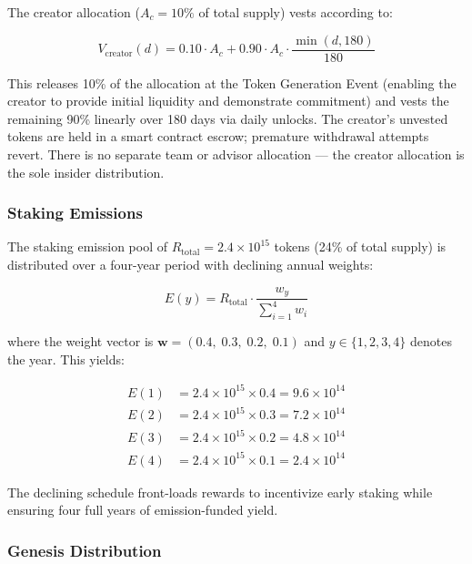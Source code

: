 The creator allocation ($A_c = 10\%$ of total supply) vests according to:

\begin{equation}
  V_{\text{creator}}(d) = 0.10 \cdot A_c + 0.90 \cdot A_c \cdot \frac{\min(d, 180)}{180}
  \label{eq:creator-vesting}
\end{equation}

This releases 10\% of the allocation at the Token Generation Event (enabling
the creator to provide initial liquidity and demonstrate commitment) and vests
the remaining 90\% linearly over 180 days via daily unlocks. The creator's
unvested tokens are held in a smart contract escrow; premature withdrawal
attempts revert. There is no separate team or advisor allocation --- the
creator allocation is the sole insider distribution.

\subsubsection{Staking Emissions}

The staking emission pool of $R_{\text{total}} = 2.4 \times 10^{15}$ tokens
(24\% of total supply) is distributed over a four-year period with declining
annual weights:

\begin{equation}
  E(y) = R_{\text{total}} \cdot \frac{w_y}{\sum_{i=1}^{4} w_i}
  \label{eq:staking-emission}
\end{equation}

where the weight vector is $\mathbf{w} = (0.4,\; 0.3,\; 0.2,\; 0.1)$ and $y
\in \{1,2,3,4\}$ denotes the year. This yields:

\begin{align}
  E(1) &= 2.4 \times 10^{15} \times 0.4 = 9.6 \times 10^{14} \label{eq:emission-y1} \\
  E(2) &= 2.4 \times 10^{15} \times 0.3 = 7.2 \times 10^{14} \label{eq:emission-y2} \\
  E(3) &= 2.4 \times 10^{15} \times 0.2 = 4.8 \times 10^{14} \label{eq:emission-y3} \\
  E(4) &= 2.4 \times 10^{15} \times 0.1 = 2.4 \times 10^{14} \label{eq:emission-y4}
\end{align}

The declining schedule front-loads rewards to incentivize early staking while
ensuring four full years of emission-funded yield.

\subsubsection{Genesis Distribution}

